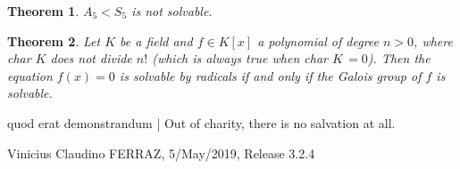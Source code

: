 \documentclass[11pt,a4paper]{article}
\newtheorem{thm}{Theorem}
\begin{document}
\begin{thm}
$A_5 < S_5$ is not solvable.
\end{thm}

\begin{thm}
Let $K$ be a field and $f \in K[x]$ a polynomial of degree $n > 0$, where char $K$ does not divide $n!$ (which is always true when char $K\,= 0$). Then the equation $f(x) = 0$ is solvable by radicals if and only if the Galois group of $f$ is solvable.
\end{thm}

\vspace{3mm}

quod erat demonstrandum | Out of charity, there is no salvation at all.

\vspace{3mm}

Vinicius Claudino FERRAZ, 5/May/2019, Release 3.2.4
\end{document}
